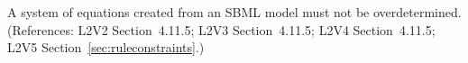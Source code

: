 A system of equations created from an SBML model must not be
overdetermined.  (References: L2V2 Section~4.11.5; L2V3
Section~4.11.5; L2V4 Section~4.11.5; L2V5 Section~\ref{sec:ruleconstraints}.)
